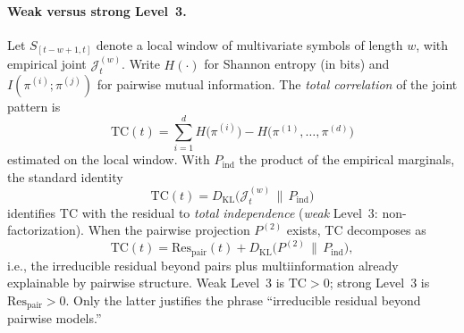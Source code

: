 \documentclass[11pt,a4paper]{article}
\begin{document}
\paragraph{Weak versus strong Level~3.}
Let $S_{[t-w+1,t]}$ denote a local window of multivariate symbols of
length $w$, with empirical joint $\mathcal{J}_t^{(w)}$. Write $H(\cdot)$
for Shannon entropy (in bits) and $I(\pi^{(i)};\pi^{(j)})$ for pairwise
mutual information. The \emph{total correlation} of the joint pattern is
\begin{equation}
\label{eq:tc}
\mathrm{TC}(t)
=\sum_{i=1}^{d} H\bigl(\pi^{(i)}\bigr)
-H\bigl(\pi^{(1)},\ldots,\pi^{(d)}\bigr)
\end{equation}
estimated on the local window. With $P_{\mathrm{ind}}$ the product of
the empirical marginals, the standard identity
\begin{equation}
\label{eq:tc_kl}
\mathrm{TC}(t)
=D_{\mathrm{KL}}\bigl(\mathcal{J}_t^{(w)}\,\|\,P_{\mathrm{ind}}\bigr)
\end{equation}
identifies TC with the residual to \emph{total independence}
(\emph{weak} Level~3: non-factorization). When the pairwise projection
$P^{(2)}$ exists, TC decomposes as
\begin{equation}
\label{eq:tc_decomp}
\mathrm{TC}(t)
=\mathrm{Res}_{\mathrm{pair}}(t)
+D_{\mathrm{KL}}\bigl(P^{(2)}\,\|\,P_{\mathrm{ind}}\bigr),
\end{equation}
i.e., the irreducible residual beyond pairs plus multiinformation already
explainable by pairwise structure. Weak Level~3 is TC$>0$; strong
Level~3 is $\mathrm{Res}_{\mathrm{pair}}>0$. Only the latter justifies
the phrase ``irreducible residual beyond pairwise models.''
\end{document}
